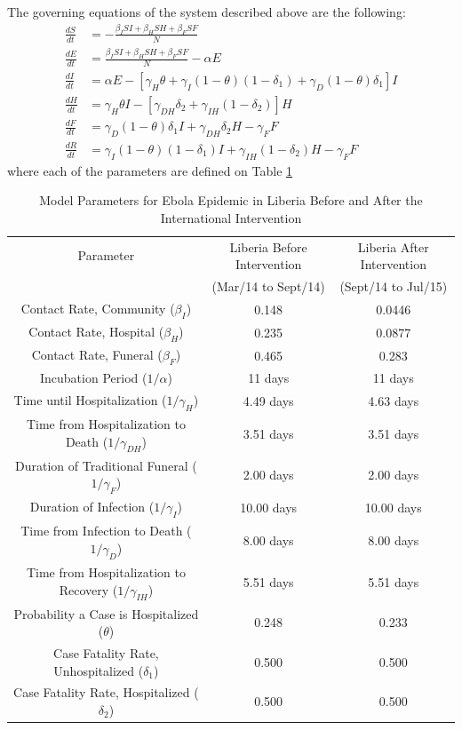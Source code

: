 \documentclass[10pt]{article}
\begin{document}
 
The governing equations of the system described above are the following:
\begin{align*} 
\frac{dS}{dt} &= - \frac{\beta_{I}SI+\beta_{H}SH+\beta_{F}SF}{N}\\
\frac{dE}{dt} &=  \frac{\beta_{I}SI+\beta_{H}SH+\beta_{F}SF}{N}-\alpha E\\
\frac{dI}{dt} &=  \alpha E - [\gamma_{H}\theta + \gamma_{I}(1-\theta)(1-\delta_{1})+\gamma_{D}(1-\theta)\delta_{1}]I\\
\frac{dH}{dt} &= \gamma_{H}\theta I - [\gamma_{DH}\delta_{2}+\gamma_{IH}(1-\delta_{2})]H\\
\frac{dF}{dt} &= \gamma_{D}(1-\theta) \delta_{1} I + \gamma_{DH}\delta_{2} H-\gamma_{F} F\\
\frac{dR}{dt} &= \gamma_{I}(1-\theta)(1- \delta_{1}) I + \gamma_{IH}(1-\delta_{2}) H-\gamma_{F} F
\end{align*}
where each of the parameters are defined on Table \ref{tab:parameters}


\begin{table}[ht]
\caption{Model Parameters for Ebola Epidemic in Liberia Before  and After the International Intervention} %
\centering %
\begin{tabular}{c c c } 
\hline\hline %
Parameter & Liberia Before Intervention  & Liberia After Intervention \\ [0.5ex] 
 & (Mar/14 to Sept/14) &  (Sept/14 to Jul/15) \\ [0.5ex] %
\hline %
Contact Rate, Community  ($\beta_{I}$) & 0.148 & 0.0446  \\ 
Contact Rate, Hospital  ($\beta_{H}$) & 0.235 & 0.0877  \\
Contact Rate, Funeral  ($\beta_{F}$) & 0.465 & 0.283 \\
Incubation Period (${1}/{\alpha}$) & 11 days & 11 days  \\
Time until Hospitalization (${1}/{\gamma_{H}}$) & 4.49 days & 4.63 days  \\
Time from Hospitalization to Death (${1}/{\gamma_{DH}}$) & 3.51 days & 3.51 days  \\ 
Duration of Traditional Funeral (${1}/{\gamma_{F}}$) & 2.00 days & 2.00 days  \\
Duration of Infection (${1}/{\gamma_{I}}$) & 10.00 days & 10.00 days  \\
Time from Infection to Death (${1}/{\gamma_{D}}$) & 8.00 days & 8.00 days  \\
Time from Hospitalization to Recovery (${1}/{\gamma_{IH}}$) & 5.51 days & 5.51 days  \\
Probability a Case is Hospitalized ($\theta$) & 0.248 & 0.233 \\
Case Fatality Rate, Unhospitalized ($\delta_{1}$) & 0.500  & 0.500  \\
Case Fatality Rate, Hospitalized ($\delta_{2}$) & 0.500 & 0.500 \\ [1ex] 
\hline 
\end{tabular}
\label{tab:parameters}
\end{table}
\end{document}
